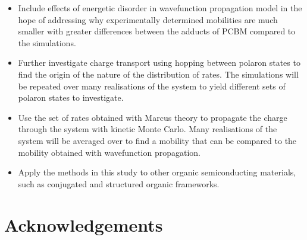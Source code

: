\documentclass[a4paper,12pt]{article}
\begin{document}
\begin{itemize}

\item Include effects of energetic disorder in wavefunction propagation model in the hope of addressing why experimentally determined mobilities are much smaller with greater differences between the adducts of PCBM compared to the simulations.

\item Further investigate charge transport using hopping between polaron states to find the origin of the nature of the distribution of rates. The simulations will be repeated over many realisations of the system to yield different sets of polaron states to investigate.

\item Use the set of rates obtained with Marcus theory to propagate the charge through the system with kinetic Monte Carlo. Many realisations of the system will be averaged over to find a mobility that can be compared to the mobility obtained with wavefunction propagation.

\item Apply the methods in this study to other organic semiconducting materials, such as conjugated and structured organic frameworks.

\end{itemize}


%
%
%
%

\section{Acknowledgements}
\end{document}
